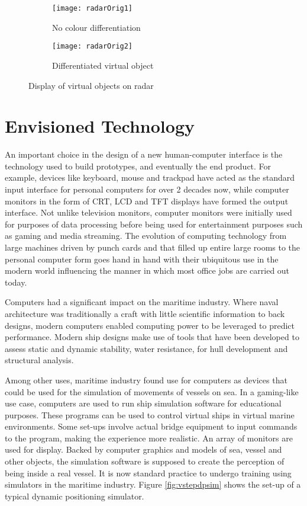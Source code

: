 \begin{figure}[ht]
    \centering
    \begin{subfigure}[b]{0.45\textwidth}
        \centering
        \texttt{[image: radarOrig1]}
        \caption{No colour differentiation}
        \label{fig:three sin x}
    \end{subfigure}
    \hfill
    \begin{subfigure}[b]{0.45\textwidth}
        \centering
        \texttt{[image: radarOrig2]}
        \caption{Differentiated virtual object}
        \label{fig:five over x}
    \end{subfigure}
    \caption{Display of virtual objects on radar}
    \label{fig:three graphs}
\end{figure}

\section{Envisioned Technology}
\label{sec:envisionedtech}
An important choice in the design of a new human-computer interface is the technology used to build prototypes, and eventually the end product. For example, devices like keyboard, mouse and trackpad have acted as the standard input interface for personal computers for over 2 decades now, while computer monitors in the form of CRT, LCD and TFT displays have formed the output interface. Not unlike television monitors, computer monitors were initially used for purposes of data processing before being used for entertainment purposes such as gaming and media streaming. The evolution of computing technology from large machines driven by punch cards and that filled up entire large rooms to the personal computer form goes hand in hand with their ubiquitous use in the modern world influencing the manner in which most office jobs are carried out today. 

Computers had a significant impact on the maritime industry. Where naval architecture was traditionally a craft with little scientific information to back designs, modern computers enabled computing power to be leveraged to predict performance. Modern ship designs make use of tools that have been developed to assess static and dynamic stability, water resistance, for hull development and structural analysis. 

Among other uses, maritime industry found use for computers as devices that could be used for the simulation of movements of vessels on sea. In a gaming-like use case, computers are used to run ship simulation software for educational purposes. These programs can be used to control virtual ships in virtual marine environments. Some set-ups involve actual bridge equipment to input commands to the program, making the experience more realistic. An array of monitors are used for display. Backed by computer graphics and models of sea, vessel and other objects, the simulation software is supposed to create the perception of being inside a real vessel. It is now standard practice to undergo training using simulators in the maritime industry. Figure \ref{fig:vstepdpsim} shows the set-up of a typical dynamic positioning simulator. 


